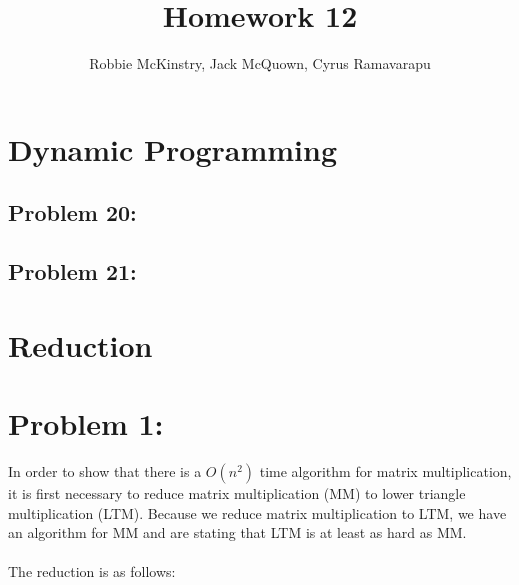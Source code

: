 \documentclass[12pt]{article}
\begin{document}
\title{Homework 12}
\author{Robbie McKinstry, Jack McQuown, Cyrus Ramavarapu}
\renewcommand{\today}{30 September 2016}
\renewcommand{\baselinestretch}{1.5}
\maketitle

\section*{Dynamic Programming}
\subsection*{Problem 20: }
\subsection*{Problem 21: }

\section*{Reduction}
\section*{Problem 1: }
In order to show that there is a {$O(n^2)$} time algorithm for matrix multiplication, it is first necessary to reduce matrix multiplication (MM) to lower triangle multiplication (LTM). Because we reduce matrix multiplication to LTM, we have an algorithm for MM and are stating that LTM is at least as hard as MM.\\\\
The reduction is as follows:\\
\end{document}

